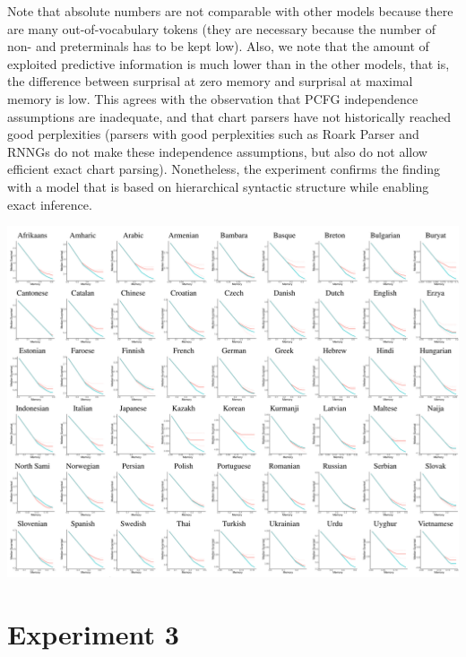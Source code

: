 \documentclass[11pt,letterpaper]{article}
\newcommand\mhahn[1]{{\color{red}(#1)}}
\begin{document}

Note that absolute numbers are not comparable with other models because there are many out-of-vocabulary tokens (they are necessary because the number of non- and preterminals has to be kept low).
Also, we note that the amount of exploited predictive information is much lower than in the other models, that is, the difference between surprisal at zero memory and surprisal at maximal memory is low.
This agrees with the observation that PCFG independence assumptions are inadequate, and that chart parsers have not historically reached good perplexities (parsers with good perplexities such as Roark Parser and RNNGs do not make these independence assumptions, but also do not allow efficient exact chart parsing).
Nonetheless, the experiment confirms the finding with a model that is based on hierarchical syntactic structure while enabling exact inference.

\begin{center}
\includegraphics[width=\textwidth]{results-table-pcfg.pdf}
\label{fig:resu-pcfg}
\end{center}




\section{Experiment 3}
\end{document}
